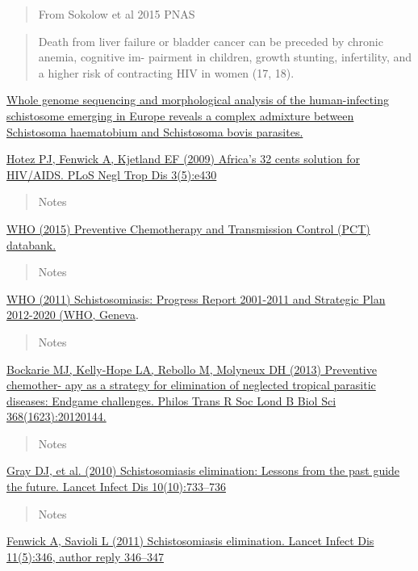 \documentclass[10,portrait]{article}
\begin{document}
\begin{quote}
From Sokolow et al 2015 PNAS
\end{quote}

\begin{quote}
Death from liver failure or bladder cancer can be preceded by chronic
anemia, cognitive im- pairment in children, growth stunting,
infertility, and a higher risk of contracting HIV in women (17, 18).
\end{quote}

\href{https://www.biorxiv.org/content/early/2018/08/11/387969}{Whole
genome sequencing and morphological analysis of the human-infecting
schistosome emerging in Europe reveals a complex admixture between
Schistosoma haematobium and Schistosoma bovis parasites.}

\href{}{Hotez PJ, Fenwick A, Kjetland EF (2009) Africa's 32 cents
solution for HIV/AIDS. PLoS Negl Trop Dis 3(5):e430}

\begin{quote}
Notes
\end{quote}

\href{www.who.int/neglected_diseases/preventive_chemotherapy/databank/}{WHO
(2015) Preventive Chemotherapy and Transmission Control (PCT) databank.}

\begin{quote}
Notes
\end{quote}

\href{}{WHO (2011) Schistosomiasis: Progress Report 2001-2011 and
Strategic Plan 2012-2020 (WHO, Geneva}.

\begin{quote}
Notes
\end{quote}

\href{}{Bockarie MJ, Kelly-Hope LA, Rebollo M, Molyneux DH (2013)
Preventive chemother- apy as a strategy for elimination of neglected
tropical parasitic diseases: Endgame challenges. Philos Trans R Soc Lond
B Biol Sci 368(1623):20120144.}

\begin{quote}
Notes
\end{quote}

\href{}{Gray DJ, et al. (2010) Schistosomiasis elimination: Lessons from
the past guide the future. Lancet Infect Dis 10(10):733--736}

\begin{quote}
Notes
\end{quote}

\href{}{Fenwick A, Savioli L (2011) Schistosomiasis elimination. Lancet
Infect Dis 11(5):346, author reply 346--347}
\end{document}
